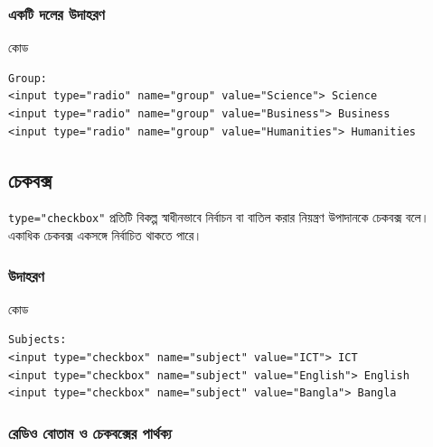 \subsubsection{একটি দলের উদাহরণ}

\begin{examplebox}{কোড}
\par\noindent\begin{minipage}{\linewidth}
\begin{verbatim}
Group:
<input type="radio" name="group" value="Science"> Science
<input type="radio" name="group" value="Business"> Business
<input type="radio" name="group" value="Humanities"> Humanities
\end{verbatim}
\end{minipage}\par
\end{examplebox}

\subsection{চেকবক্স}

\begin{definitionbox}{\texttt{type="checkbox"}}
প্রতিটি বিকল্প স্বাধীনভাবে নির্বাচন বা বাতিল করার নিয়ন্ত্রণ উপাদানকে চেকবক্স বলে। একাধিক চেকবক্স একসঙ্গে নির্বাচিত থাকতে পারে।
\end{definitionbox}

\subsubsection{উদাহরণ}

\begin{examplebox}{কোড}
\par\noindent\begin{minipage}{\linewidth}
\begin{verbatim}
Subjects:
<input type="checkbox" name="subject" value="ICT"> ICT
<input type="checkbox" name="subject" value="English"> English
<input type="checkbox" name="subject" value="Bangla"> Bangla
\end{verbatim}
\end{minipage}\par
\end{examplebox}

\subsubsection{রেডিও বোতাম ও চেকবক্সের পার্থক্য}

